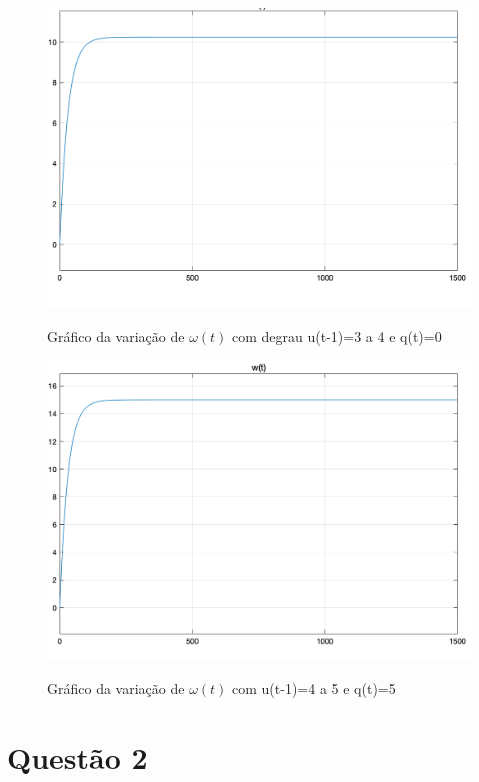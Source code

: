 \documentclass[11pt]{article}
\begin{document}
\begin{figure}[H]
	\centering
	{\includegraphics[width=\textwidth]
		{assets/q1_u(t)_3to4_q(t)_0.png}}
	\caption{ Gráfico da variação de $\omega(t)$ com degrau u(t-1)=3 a 4 e q(t)=0}
\end{figure}

\begin{figure}[H]
	\centering
	{\includegraphics[width=\textwidth]
		{assets/q1_u(t)_4to5_q(t)_5.png}}
	\caption{ Gráfico da variação de $\omega(t)$ com u(t-1)=4 a 5 e q(t)=5}
\end{figure}

\section{Questão 2}
\end{document}
